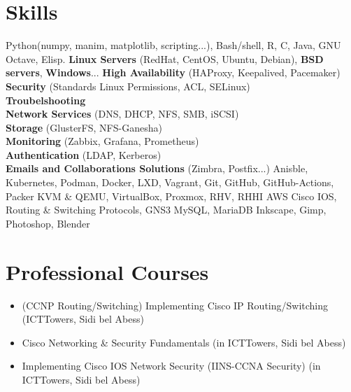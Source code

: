 \documentclass{cv}
\begin{document}
\section{Skills}
    {\textnormal{Python(numpy, manim, matplotlib, scripting...),
    Bash/shell,
    R, C, Java, GNU Octave, Elisp.}}
	{}
	{}
    {\textbf{Linux Servers} \textnormal{(RedHat, CentOS, Ubuntu, Debian)}, 
    \textbf{BSD servers}, 
    \textbf{Windows}...}
	{}
	{}
      {\textbf{High Availability} \textnormal{(HAProxy, Keepalived, Pacemaker)}\\
      \textbf{Security} \textnormal{(Standards Linux Permissions, ACL, SELinux)}\\
      \textbf{Troubelshooting}\\
      \textbf{Network Services} \textnormal{(DNS, DHCP, NFS, SMB, iSCSI)}\\
      \textbf{Storage} \textnormal{(GlusterFS, NFS-Ganesha)}\\ 
      \textbf{Monitoring} \textnormal{(Zabbix, Grafana, Prometheus)}\\ 
      \textbf{Authentication} \textnormal{(LDAP, Kerberos)}\\
      \textbf{Emails and Collaborations Solutions} \textnormal{(Zimbra, Postfix...)}}
	{}
	{}
	{Anisble, Kubernetes, Podman, Docker, LXD, Vagrant, Git, GitHub, GitHub-Actions, Packer}
	{}
	{}
    {KVM \& QEMU, VirtualBox, Proxmox, RHV, RHHI}
	{}
	{}
    {AWS}
	{}
	{}
    {Cisco IOS, Routing \& Switching Protocols, GNS3}
	{}
	{}
	{MySQL, MariaDB}
	{}
	{}
	{Inkscape, Gimp, Photoshop, Blender}
	{}

\section{Professional Courses}
\begin{itemize}
  \item (CCNP Routing/Switching) Implementing Cisco IP Routing/Switching  (ICTTowers, Sidi bel Abess)
  \item Cisco Networking \& Security Fundamentals (in ICTTowers, Sidi bel Abess)
  \item Implementing Cisco IOS Network Security (IINS-CCNA Security) (in ICTTowers, Sidi bel Abess)
\end{itemize}
\end{document}
